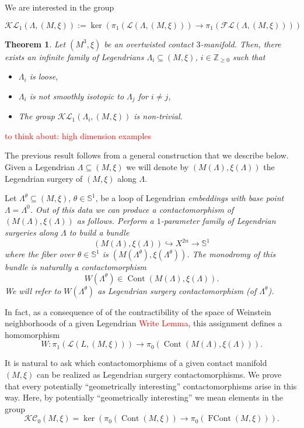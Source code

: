 \documentclass[11pt]{amsart}
\theoremstyle{plain}
\newtheorem{theorem}{Theorem}
\theoremstyle{definition}
\theoremstyle{remark}
\numberwithin{theorem}{section}
\newcommand{\Z}{\mathbb{Z}}           %
\newcommand{\NS}{{\mathbb{S}}}
\renewcommand{\L}{\mathcal{L}}           %
\newcommand{\FL}{\mathcal{FL}}           %
\newcommand{\KL}{\mathcal{KL}}
\newcommand{\KC}{\mathcal{KC}}
\newcommand{\Cont}{\operatorname{Cont}}
\newcommand{\FCont}{\operatorname{FCont}}
\begin{document}
We are interested in the group 

$$ \KL_1(\Lambda,(M,\xi)):=\ker ( \pi_1(\L(\Lambda,(M,\xi)))\rightarrow \pi_1(\FL(\Lambda,(M,\xi))) ) $$

\begin{theorem}\label{thm:LoopsOfLegendrians}
Let $(M^3,\xi)$ be an overtwisted contact $3$-manifold. Then, there exists an infinite family of Legendrians $\Lambda_i\subseteq (M,\xi)$, $i\in \Z_{\geq0}$ such that
\begin{itemize}
    \item [(a)] $\Lambda_i$ is loose,
    \item [(b)] $\Lambda_i$ is not smoothly isotopic to $\Lambda_j$ for $i\neq j$,
    \item [(c)] The group $\KL_1(\Lambda_i,(M,\xi))$ is non-trivial.
\end{itemize}
\end{theorem}
\textcolor{red}{to think about: high dimension examples}

The previous result follows from a general construction that we describe below. Given a Legendrian $\Lambda\subseteq (M,\xi)$ we will denote by $(M(\Lambda),\xi(\Lambda))$ the Legendrian surgery of $(M,\xi)$ along $\Lambda$. 

Let $\Lambda^\theta\subseteq (M,\xi)$, $\theta\in \NS^1$, be a loop of Legendrian \em embeddings \em with base point $\Lambda=\Lambda^0$. Out of this data we can produce a contactomorphism of $(M(\Lambda),\xi(\Lambda))$ as follows. Perform a $1$-parameter family of Legendrian surgeries along $\Lambda$ to build a bundle 
$$ (M(\Lambda),\xi(\Lambda))\hookrightarrow X^{2n}\rightarrow \NS^1 $$
where the fiber over $\theta\in \NS^1$ is $(M(\Lambda^{\theta}),\xi(\Lambda^{\theta}))$. The monodromy of this bundle is naturally a contactomorphism 
$$ W(\Lambda^\theta)\in \Cont(M(\Lambda),\xi(\Lambda)). $$
We will refer to $W(\Lambda^\theta)$ as \em Legendrian surgery contactomorphism (of $\Lambda^\theta$).\em

In fact, as a consequence of of the contractibility of the space of Weinstein neighborhoods of a given Legendrian \textcolor{red}{Write Lemma}, this assignment defines a homomorphism
$$ W: \pi_1(\L(L,(M,\xi)))\rightarrow \pi_0(\Cont(M(\Lambda),\xi(\Lambda))). $$

It is natural to ask which contactomorphisms of a given contact manifold $(M,\xi)$ can be realized as Legendrian surgery contactomorphisms. We prove that every potentially ``geometrically interesting'' contactomorphisms arise in this way. Here, by potentially ``geometrically interesting'' we mean elements in the group 
$$ \KC_0 (M,\xi)=\ker( \pi_0(\Cont(M,\xi))\rightarrow \pi_0(\FCont(M,\xi))). $$
\end{document}
